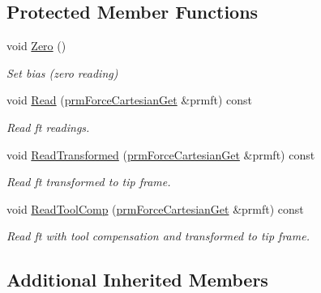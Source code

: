 \subsection*{Protected Member Functions}
\begin{DoxyCompactItemize}
\item 
void \hyperlink{classmts_j_r3_force_sensor_a4608eb3b3309a7e5465b02f7298b1498}{Zero} ()
\begin{DoxyCompactList}\small\item\em Set bias (zero reading) \end{DoxyCompactList}\item 
void \hyperlink{classmts_j_r3_force_sensor_ab099691a9a2b7966c91d53adb3510718}{Read} (\hyperlink{classprm_force_cartesian_get}{prm\-Force\-Cartesian\-Get} \&prmft) const 
\begin{DoxyCompactList}\small\item\em Read ft readings. \end{DoxyCompactList}\item 
void \hyperlink{classmts_j_r3_force_sensor_afabe5cf81353bf58913155fc96724552}{Read\-Transformed} (\hyperlink{classprm_force_cartesian_get}{prm\-Force\-Cartesian\-Get} \&prmft) const 
\begin{DoxyCompactList}\small\item\em Read ft transformed to tip frame. \end{DoxyCompactList}\item 
void \hyperlink{classmts_j_r3_force_sensor_a46c3f4de1e24f1f8def30c3f26026a9c}{Read\-Tool\-Comp} (\hyperlink{classprm_force_cartesian_get}{prm\-Force\-Cartesian\-Get} \&prmft) const 
\begin{DoxyCompactList}\small\item\em Read ft with tool compensation and transformed to tip frame. \end{DoxyCompactList}\end{DoxyCompactItemize}
\subsection*{Additional Inherited Members}


